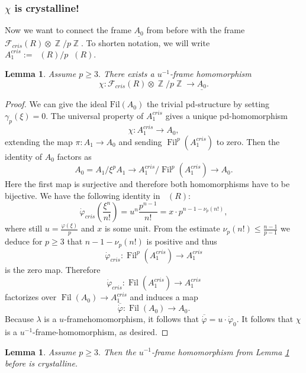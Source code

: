 \documentclass[a4paper,10,5 pt]{amsart}
\newtheorem{Lemma}[Satz]{Lemma}
\theoremstyle{definition}
\DeclareMathOperator{\Acris}{\mathbb{A}_{cris}}
\DeclareMathOperator{\Fil}{Fil}
\DeclareMathOperator{\Z}{\mathbb{Z}}
\begin{document}
\subsubsection{$\chi$ is crystalline!}
Now we want to connect the frame $\underline{A_{0}}$ from before with the frame $\mathcal{F}_{cris}(R)\otimes \Z /p\Z$. To shorten notation, we will write $A_{1}^{cris}:=\Acris(R)/p\Acris(R).$
\\
\begin{Lemma}\label{Framemorphismus von Acris mod p zu A0} Assume $p\geq 3.$
There exists a $u^{-1}$-frame homomorphism
$$\chi\colon \mathcal{F}_{cris}(R)\otimes \Z /p\Z \rightarrow \underline{A_{0}}.$$
\end{Lemma}
\begin{proof}
We can give the ideal $\text{Fil}(A_{0})$ the trivial pd-structure by setting $\gamma_{p}(\xi)=0.$ The universal property of $A_{1}^{cris}$  gives a unique pd-homomorphism
$$\chi\colon A_{1}^{cris}\rightarrow A_{0},$$
extending the map $\pi\colon A_{1}\rightarrow A_{0}$ and sending $\Fil^{p}(A_{1}^{cris})$ to zero. Then the identity of $A_{0}$ factors as
$$A_{0}=A_{1}/\xi^{p}A_{1}\rightarrow A_{1}^{cris}/\Fil^{p}(A_{1}^{cris}) \rightarrow A_{0}.$$
Here the first map is surjective and therefore both homomorphisms have to be bijective.
We have the following identity in $\Acris(R):$
\begin{equation}
\dot{\varphi}_{cris}(\frac{\xi^{n}}{n!})=u^{n}\frac{p^{n-1}}{n!}=x\cdot p^{n-1-\nu_{p}(n!)},
\end{equation}
where still $u=\frac{\varphi(\xi)}{p}$ and $x$ is some unit. From the estimate $\nu_{p}(n!)\leq \frac{n-1}{p-1}$ we deduce for $p\geq 3$ that $n-1-\nu_{p}(n!)$ is positive and thus
$$\dot{\varphi}_{cris}\colon \Fil^{p}(A_{1}^{cris})\rightarrow A_{1}^{cris}$$ is the zero map. Therefore
$$\dot{\varphi}_{cris}\colon \Fil(A_{1}^{cris})\rightarrow A_{1}^{cris}$$ factorizes over $\Fil(A_{0})\rightarrow A_{1}^{cris}$ and induces a map
$$\overline{\dot{\varphi}}\colon \Fil(A_{0})\rightarrow A_{0}.$$
Because $\lambda$ is a $u$-framehomomorphism, it follows that $\overline{\dot{\varphi}}=u\cdot \dot{\varphi}_{0}.$ It follows that $\chi$ is a $u^{-1}$-frame-homomorphism, as desired.
\end{proof}
\begin{Lemma}\label{chi ist kristalline!}
Assume $p\geq 3.$ Then the $u^{-1}$-frame homomorphism from Lemma \ref{Framemorphismus von Acris mod p zu A0} before is crystalline.
\end{Lemma}
\end{document}
